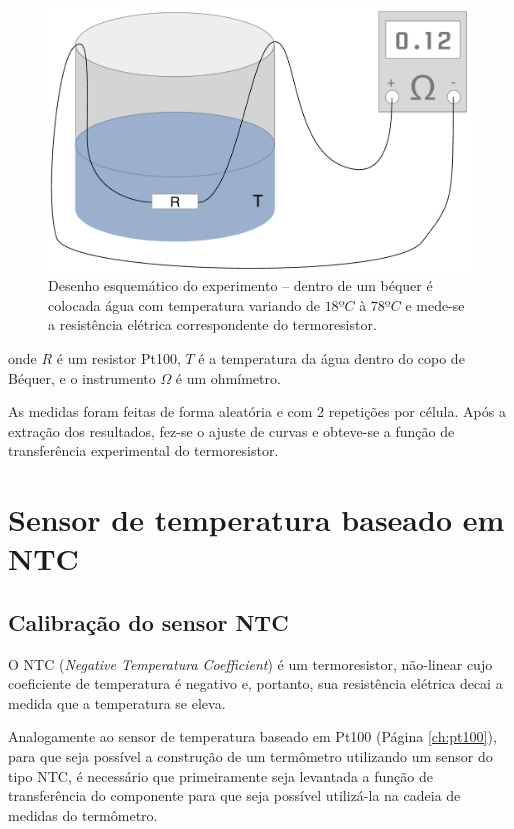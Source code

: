 \documentclass[a4paper]{instrumentacao}
\begin{document}
\begin{figure}[H]
\center
\includegraphics[width=\textwidth]{Bequer.pdf}
\caption{Desenho esquemático do experimento -- dentro de um béquer é colocada água com temperatura variando de $18ºC$ à $78ºC$ e mede-se a resistência elétrica correspondente do termoresistor.}
\label{fig:pt100-esquematico}
\end{figure}

\noindent
onde $R$ é um resistor Pt100, $T$ é a temperatura da água dentro do copo de Béquer, e o instrumento $\Omega$ é um ohmímetro.

As medidas foram feitas de forma aleatória e com 2 repetições por célula. Após a extração dos resultados, fez-se o ajuste de curvas e obteve-se a função de transferência experimental do termoresistor.


\chapter{Sensor de temperatura baseado em NTC}

\section{Calibração do sensor NTC}
O NTC (\textit{Negative Temperatura Coefficient}) é um termoresistor, não-linear cujo coeficiente de temperatura é negativo e, portanto, sua resistência elétrica decai a medida que a temperatura se eleva.

Analogamente ao sensor de temperatura baseado em Pt100 (Página \ref{ch:pt100}), para que seja possível a construção de um termômetro utilizando um sensor do tipo NTC, é necessário que primeiramente seja levantada a função de transferência do componente para que seja possível utilizá-la na cadeia de medidas do termômetro.
\end{document}
